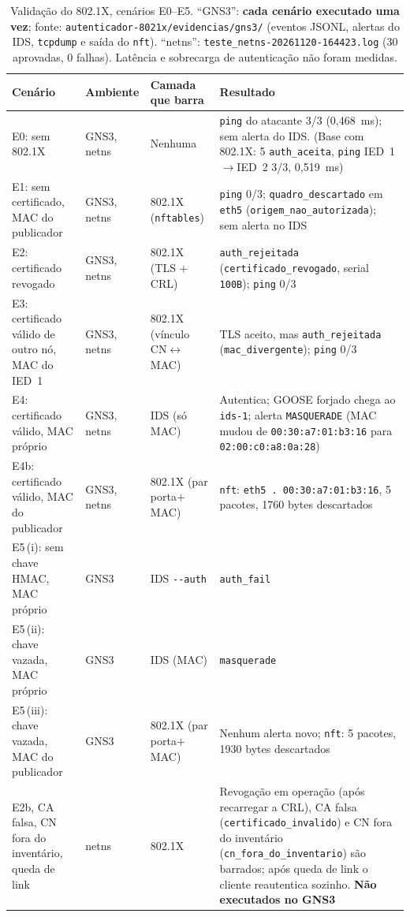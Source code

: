 \documentclass[12pt]{article}
\newcommand{\dd}{-{}-}
\begin{document}
\begin{table}[!htb]
\centering
\caption{Valida\c{c}\~ao do 802.1X, cen\'arios E0--E5. ``GNS3'': \textbf{cada cen\'ario executado uma vez}; fonte: \texttt{autenticador-8021x/evidencias/gns3/} (eventos JSONL, alertas do IDS, \texttt{tcpdump} e sa\'ida do \texttt{nft}). ``netns'': \texttt{teste\_netns-20261120-164423.log} (30 aprovadas, 0 falhas). Lat\^encia e sobrecarga de autentica\c{c}\~ao n\~ao foram medidas.}\label{tab:8021x}
\scriptsize
\begin{tabularx}{\linewidth}{@{}L{3.0cm}L{1.4cm}L{2.0cm}Y@{}}
\toprule
Cen\'ario & Ambiente & Camada que barra & Resultado \\
\midrule
E0: sem 802.1X & GNS3, netns & Nenhuma & \texttt{ping} do atacante 3/3 (0,468~ms); sem alerta do IDS. (Base com 802.1X: 5 \texttt{auth\_aceita}, \texttt{ping} IED~1$\rightarrow$IED~2 3/3, 0,519~ms) \\
E1: sem certificado, MAC do publicador & GNS3, netns & 802.1X (\texttt{nftables}) & \texttt{ping} 0/3; \texttt{quadro\_descartado} em \texttt{eth5} (\texttt{origem\_nao\_autorizada}); sem alerta no IDS \\
E2: certificado revogado & GNS3, netns & 802.1X (TLS $+$ CRL) & \texttt{auth\_rejeitada} (\texttt{certificado\_revogado}, serial \texttt{100B}); \texttt{ping} 0/3 \\
E3: certificado v\'alido de outro n\'o, MAC do IED~1 & GNS3, netns & 802.1X (v\'inculo CN$\leftrightarrow$MAC) & TLS aceito, mas \texttt{auth\_rejeitada} (\texttt{mac\_divergente}); \texttt{ping} 0/3 \\
E4: certificado v\'alido, MAC pr\'oprio & GNS3, netns & IDS (s\'o MAC) & Autentica; GOOSE forjado chega ao \texttt{ids-1}; alerta \texttt{MASQUERADE} (MAC mudou de \texttt{00:30:a7:01:b3:16} para \texttt{02:00:c0:a8:0a:28}) \\
E4b: certificado v\'alido, MAC do publicador & GNS3, netns & 802.1X (par porta$+$MAC) & \texttt{nft}: \texttt{eth5 . 00:30:a7:01:b3:16}, 5 pacotes, 1760 bytes descartados \\
E5\,(i): sem chave HMAC, MAC pr\'oprio & GNS3 & IDS \texttt{\dd{}auth} & \texttt{auth\_fail} \\
E5\,(ii): chave vazada, MAC pr\'oprio & GNS3 & IDS (MAC) & \texttt{masquerade} \\
E5\,(iii): chave vazada, MAC do publicador & GNS3 & 802.1X (par porta$+$MAC) & Nenhum alerta novo; \texttt{nft}: 5 pacotes, 1930 bytes descartados \\
\midrule
E2b, CA falsa, CN fora do invent\'ario, queda de link & netns & 802.1X & Revoga\c{c}\~ao em opera\c{c}\~ao (ap\'os recarregar a CRL), CA falsa (\texttt{certificado\_invalido}) e CN fora do invent\'ario (\texttt{cn\_fora\_do\_inventario}) s\~ao barrados; ap\'os queda de link o cliente reautentica sozinho. \textbf{N\~ao executados no GNS3} \\
\bottomrule
\end{tabularx}
\end{table}
\end{document}
